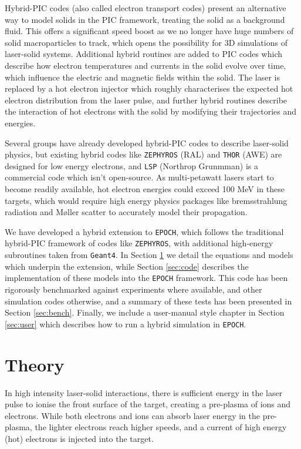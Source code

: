 \documentclass[12pt]{article}
\numberwithin{equation}{section}
\begin{document}
Hybrid-PIC codes (also called electron transport codes) present an alternative way to model solids in the PIC framework, treating the solid as a background fluid. This offers a significant speed boost as we no longer have huge numbers of solid macroparticles to track, which opens the possibility for 3D simulations of laser-solid systems. Additional hybrid routines are added to PIC codes which describe how electron temperatures and currents in the solid evolve over time, which influence the electric and magnetic fields within the solid. The laser is replaced by a hot electron injector which roughly characterises the expected hot electron distribution from the laser pulse, and further hybrid routines describe the interaction of hot electrons with the solid by modifying their trajectories and energies.

Several groups have already developed hybrid-PIC codes to describe laser-solid physics, but existing hybrid codes like \texttt{ZEPHYROS} (RAL) and \texttt{THOR} (AWE) are designed for low energy electrons, and \texttt{LSP} (Northrop Grunmman) is a commercial code which isn't open-source. As multi-petawatt lasers start to become readily available, hot electron energies could exceed 100 MeV in these targets, which would require high energy physics packages like bremsstrahlung radiation and M\o{}ller scatter to accurately model their propagation.

We have developed a hybrid extension to \texttt{EPOCH}, which follows the traditional hybrid-PIC framework of codes like \texttt{ZEPHYROS}, with additional high-energy subroutines taken from \texttt{Geant4}. In Section \ref{sec:theory} we detail the equations and models which underpin the extension, while Section \ref{sec:code} describes the implementation of these models into the \texttt{EPOCH} framework. This code has been rigorously benchmarked against experiments where available, and other simulation codes otherwise, and a summary of these tests has been presented in Section \ref{sec:bench}. Finally, we include a user-manual style chapter in Section \ref{sec:user} which describes how to run a hybrid simulation in \texttt{EPOCH}.

\section{Theory} \label{sec:theory}

In high intensity laser-solid interactions, there is sufficient energy in the laser pulse to ionise the front surface of the target, creating a pre-plasma of ions and electrons. While both electrons and ions can absorb laser energy in the pre-plasma, the lighter electrons reach higher speeds, and a current of high energy (hot) electrons is injected into the target.
\end{document}
